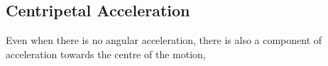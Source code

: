 


\subsection{Centripetal Acceleration}%
Even when there is no angular acceleration, there is also a component of
acceleration towards the centre of the motion,
